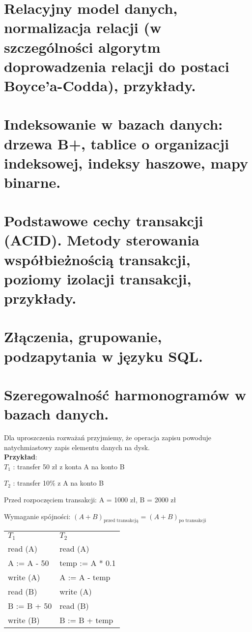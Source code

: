 \documentclass[main.tex]{subfiles}
\begin{document}
    \section{Relacyjny model danych, normalizacja relacji (w szczególności algorytm doprowadzenia relacji do postaci Boyce’a-Codda), przykłady.}
    \section{Indeksowanie w bazach danych: drzewa B+, tablice o organizacji indeksowej, indeksy haszowe, mapy binarne.}
    \section{Podstawowe cechy transakcji (ACID). Metody sterowania współbieżnością transakcji, poziomy izolacji transakcji, przykłady.}
    \section{Złączenia, grupowanie, podzapytania w języku SQL.}

    \newpage

    \section{Szeregowalność harmonogramów w bazach danych.}

    Dla uproszczenia rozważań przyjmiemy, że operacja zapisu powoduje natychmiastowy zapis elementu danych na dysk.\\

    \textbf{Przykład}:\\

    $T_1$ : transfer 50 zł z konta A na konto B

    $T_2$ : transfer 10\% z A na konto B

    Przed rozpoczęciem transakcji: A = 1000 zł, B = 2000 zł

    Wymaganie spójności: $( A + B )_{\text{przed transakcją}} = ( A + B )_{\text{po transakcji}}$

    \begin{table}[H]
        \begin{center}
            \begin{tabular}{p{8cm} p{8cm}}
                $T_1$ & $T_2$ \\
                read (A) & read (A)\\
                A := A - 50 & temp := A * 0.1\\
                write (A) & A := A - temp\\
                read (B) & write (A)\\
                B := B + 50 & read (B)\\
                write (B) & B := B + temp\\
            \end{tabular}
        \end{center}
    \end{table}
\end{document}
